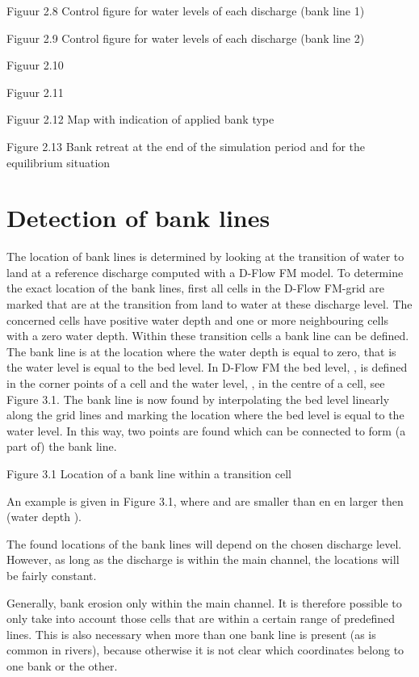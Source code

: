 Figuur 2.8	Control figure for water levels of each discharge (bank line 1)



Figuur 2.9	Control figure for water levels of each discharge (bank line 2)



Figuur 2.10	



Figuur 2.11	


Figuur 2.12	Map with indication of applied bank type



Figure 2.13 Bank retreat at the end of the simulation period and for the equilibrium situation



\section{Detection of bank lines}

The location of bank lines is determined by looking at the transition of water to land at a reference discharge computed with a D-Flow FM model.
To determine the exact location of the bank lines, first all cells in the D-Flow FM-grid are marked that are at the transition from land to water at these discharge level.
The concerned cells have positive water depth and one or more neighbouring cells with a zero water depth.
Within these transition cells a bank line can be defined.
The bank line is at the location where the water depth is equal to zero, that is the water level is equal to the bed level.
In D-Flow FM the bed level,  , is defined in the corner points of a cell and the water level,  , in the centre of a cell, see Figure 3.1.
The bank line is now found by interpolating the bed level linearly along the grid lines and marking the location where the bed level is equal to the water level.
In this way, two points are found which can be connected to form (a part of) the bank line.

Figure 3.1 Location of a bank line within a transition cell


An example is given in Figure 3.1, where   and   are smaller than   en   en   larger then   (water depth  ).

The found locations of the bank lines will depend on the chosen discharge level.
However, as long as the discharge is within the main channel, the locations will be fairly constant.

Generally, bank erosion only within the main channel.
It is therefore possible to only take into account those cells that are within a certain range of predefined lines.
This is also necessary when more than one bank line is present (as is common in rivers), because otherwise it is not clear which coordinates belong to one bank or the other.

